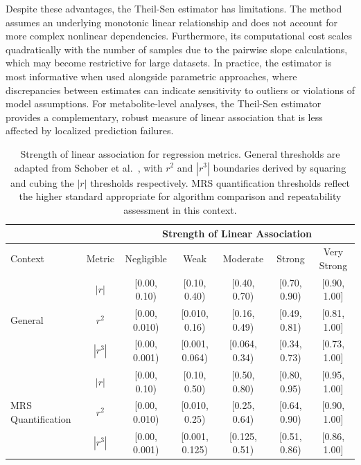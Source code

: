 Despite these advantages, the Theil-Sen estimator has limitations. The method assumes an underlying monotonic linear relationship and does not account for more complex nonlinear dependencies. Furthermore, its computational cost scales quadratically with the number of samples due to the pairwise slope calculations, which may become restrictive for large datasets. In practice, the estimator is most informative when used alongside parametric approaches, where discrepancies between estimates can indicate sensitivity to outliers or violations of model assumptions. For metabolite-level analyses, the Theil-Sen estimator provides a complementary, robust measure of linear association that is less affected by localized prediction failures.

\renewcommand{\arraystretch}{1.2}
\begin{table}[T!]
    \centering
    \begin{tabular}{|l|c||c|c|c|c|c|}\hline
         & & \multicolumn{5}{c|}{Strength of Linear Association} \\\hline
        Context & Metric & Negligible & Weak & Moderate & Strong & 
        Very Strong \\\hline \hline
        \multirow{3}{*}{General \cite{Schober2018}}
        & $|r|$    & [0.00, 0.10) & [0.10, 0.40) & [0.40, 0.70) & 
                     [0.70, 0.90) & [0.90, 1.00] \\
        & $r^2$    & [0.00, 0.010) & [0.010, 0.16) & [0.16, 0.49) & 
                     [0.49, 0.81) & [0.81, 1.00] \\
        & $|r^3|$  & [0.00, 0.001) & [0.001, 0.064) & [0.064, 0.34) & 
                     [0.34, 0.73) & [0.73, 1.00] \\\hline
        \multirow{3}{*}{MRS Quantification}
        & $|r|$    & [0.00, 0.10) & [0.10, 0.50) & [0.50, 0.80) & 
                     [0.80, 0.95) & [0.95, 1.00] \\
        & $r^2$    & [0.00, 0.010) & [0.010, 0.25) & [0.25, 0.64) & 
                     [0.64, 0.90) & [0.90, 1.00] \\
        & $|r^3|$  & [0.00, 0.001) & [0.001, 0.125) & [0.125, 0.51) & 
                     [0.51, 0.86) & [0.86, 1.00] \\\hline
    \end{tabular}
    \caption{Strength of linear association for regression metrics. 
    General thresholds are adapted from Schober et al.~\cite{Schober2018}, with $r^2$ and $|r^3|$ boundaries derived by squaring and cubing the $|r|$ thresholds respectively. MRS quantification thresholds reflect the higher standard appropriate for algorithm comparison and repeatability assessment in this context.}
    \label{tab:correlation values}
\end{table}
\renewcommand{\arraystretch}{1.0} %
